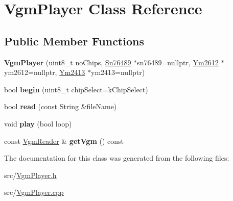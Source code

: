 \hypertarget{classVgmPlayer}{}\section{Vgm\+Player Class Reference}
\label{classVgmPlayer}
\subsection*{Public Member Functions}
\begin{DoxyCompactItemize}
\item 
\mbox{\label{classVgmPlayer_af7c6f905b483f5c03bbe577cd7898d76}} 
{\bfseries Vgm\+Player} (uint8\+\_\+t no\+Chips, \mbox{\hyperlink{classSn76489}{Sn76489}} $\ast$sn76489=nullptr, \mbox{\hyperlink{classYm2612}{Ym2612}} $\ast$ym2612=nullptr, \mbox{\hyperlink{classYm2413}{Ym2413}} $\ast$ym2413=nullptr)
\item 
\mbox{\label{classVgmPlayer_a5021e505b493e4d3e1b9557b2633ce40}} 
bool {\bfseries begin} (uint8\+\_\+t chip\+Select=k\+Chip\+Select)
\item 
\mbox{\label{classVgmPlayer_afdc518a8b12244d723d414e764dad744}} 
bool {\bfseries read} (const String \&file\+Name)
\item 
\mbox{\label{classVgmPlayer_aaae3f8ec33c2e3e5fe362d734176cb17}} 
void {\bfseries play} (bool loop)
\item 
\mbox{\label{classVgmPlayer_af430c4f3989886f289e6b40b9006037c}} 
const \mbox{\hyperlink{classVgmReader}{Vgm\+Reader}} \& {\bfseries get\+Vgm} () const
\end{DoxyCompactItemize}


The documentation for this class was generated from the following files\+:\begin{DoxyCompactItemize}
\item 
src/\mbox{\hyperlink{VgmPlayer_8h}{Vgm\+Player.\+h}}\item 
src/\mbox{\hyperlink{VgmPlayer_8cpp}{Vgm\+Player.\+cpp}}\end{DoxyCompactItemize}

